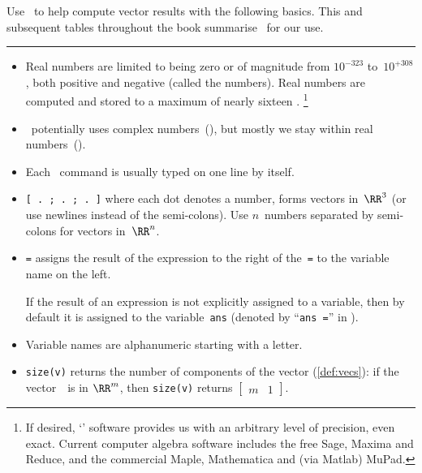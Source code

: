 \begin{table}
\caption{Use \script\ to help compute vector results with the following basics.  
This and subsequent tables throughout the book summarise \script\ for our use.
} \label{tbl:mtlbpre}
\hrule
\begin{minipage}{\linewidth}
\begin{itemize}
\item Real numbers are limited to being zero or of magnitude from \(10^{-323}\)  to~\(10^{+308}\), both positive and negative (called the  numbers).
Real numbers are computed and stored to a maximum  of nearly sixteen .%
\footnote{If desired, `' software provides us with an arbitrary level of precision, even exact.
Current computer algebra software includes the free Sage, Maxima and Reduce, and the commercial Maple, Mathematica and (via Matlab) MuPad.}

\item \script\ potentially uses complex numbers~(\CC), but mostly we stay within real numbers~(\RR).

\item Each \script\ command is usually typed on one line by itself.

\item {}\verb|[ . ; . ; . ]| where each dot denotes a number, forms vectors in~\(\RR^3\) (or use newlines instead of the semi-colons).  
Use \(n\)~numbers separated by semi-colons for vectors in~\(\RR^n\).

\item {}\verb|=| assigns the result of the expression to the right of the~\verb|=| to the variable name on the left.

If the result of an expression is not explicitly assigned to a variable, then by default it is assigned to the variable~\verb|ans| (denoted by ``\verb|ans =|'' in \script).

\item Variable names are alphanumeric starting with a letter.

\item {}\verb|size(v)| returns the number of components of the vector (\autoref{def:vecs}): if the vector~\vv\ is in \(\RR^m\), then \verb|size(v)| returns \(\begin{bmatrix} m&1 \end{bmatrix}\).


\end{itemize}
\end{minipage}
\end{table}
